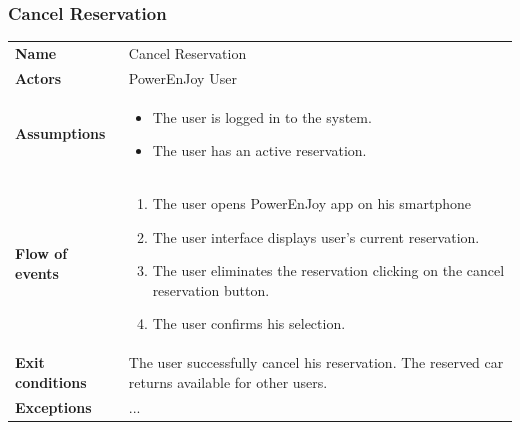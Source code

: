\documentclass[english]{article}
\begin{document}
	\subsubsection{Cancel Reservation}
	\begin{center}
	\begin{tabular}{l||p{10cm}}
	\textbf{Name} 
		& Cancel Reservation\\ [8px]
	\textbf{Actors} 
		& PowerEnJoy User\\ [8px]
	\textbf{Assumptions} 
		& \begin{itemize}
			\item The user is logged in to the system.
			\item The user has an active reservation.
		\end{itemize}\\
	\textbf{Flow of events}
		& \begin{enumerate}
 			\item The user opens PowerEnJoy app on his smartphone 
 			\item The user interface displays user's current reservation.
			\item The user eliminates the reservation clicking on the cancel reservation button.
			\item The user confirms his selection.
		\end{enumerate}\\ 
	\textbf{Exit conditions}
		&The user successfully cancel his reservation. The reserved car returns available for other users.\\ [8px]
	\textbf{Exceptions}
		&...\\[8px]
	\end{tabular}
	\end{center}
\end{document}
